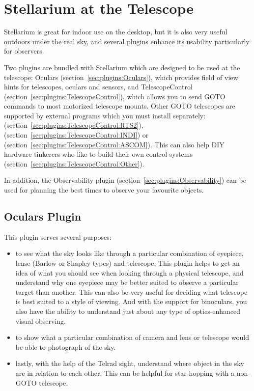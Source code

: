 \chapter{Stellarium at the Telescope}
\label{ch:atTheTelescope}

Stellarium is great for indoor use on the desktop, but it is also very
useful outdoors under the real sky, and several plugins enhance its
usability particularly for observers.

Two plugins are bundled with Stellarium which are designed to be used
at the telescope: Oculars (section~\ref{sec:plugins:Oculars}), which
provides field of view hints for telescopes, oculars and sensors, and
TelescopeControl (section~\ref{sec:plugins:TelescopeControl}), which
allows you to send GOTO commands to most motorized telescope mounts. Other
GOTO telescopes are supported by external programs which you must
install separately:  (section~\ref{sec:plugins:TelescopeControl:RTS2}), 
 (section~\ref{sec:plugins:TelescopeControl:INDI}) or  (section~\ref{sec:plugins:TelescopeControl:ASCOM}). 
This can also help DIY hardware tinkerers who like to build their own control systems (section~\ref{sec:plugins:TelescopeControl:Other}).

In addition, the Observability plugin (section~\ref{sec:plugins:Observability})
can be used for planning the best times to observe your favourite
objects.

\section{Oculars Plugin}
\label{sec:plugins:Oculars}

This plugin serves several purposes:
\begin{itemize}
\item to see what the sky looks like through a particular combination of eyepiece, lense (Barlow or Shapley types) and telescope. This plugin helps to get an idea of what you should see when looking through a physical telescope, and understand why one eyepiece may be better suited to observe a particular target than another. This can also be very useful for deciding what telescope is best suited to a style of viewing. And with the support for binoculars, you also have the ability to understand just about any type of optics-enhanced visual observing.
\item to show what a particular combination of camera and lens or telescope would be able to photograph of the sky. 
\item lastly, with the help of the Telrad sight, understand where object in the sky are in relation to each other. 
This can be helpful for star-hopping with a non-GOTO telescope. 
\end{itemize}

